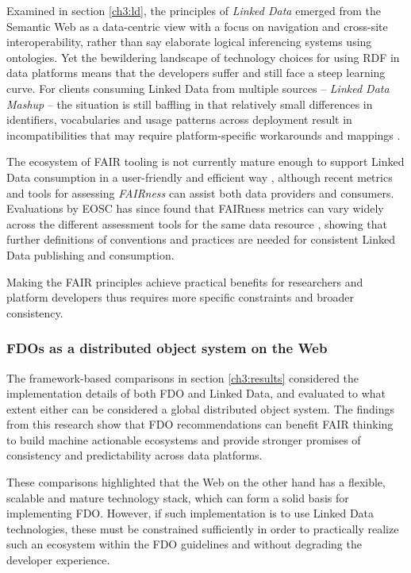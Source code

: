 Examined in section \vref{ch3:ld}, the principles of \emph{Linked Data} emerged from the Semantic Web as a data-centric view with a focus on navigation and cross-site interoperability, rather than say elaborate logical inferencing systems using ontologies.  
Yet the bewildering landscape of technology choices for using RDF in data platforms means that the developers suffer and still face a steep learning curve. 
For clients consuming Linked Data from multiple sources -- \emph{Linked Data Mashup} \cite{Tran 2014} -- the situation is still baffling in that relatively small differences in identifiers, vocabularies and usage patterns across deployment result in incompatibilities that may require platform-specific workarounds and mappings \cite{Millard 2010}. 

The ecosystem of FAIR tooling is not currently mature enough to support Linked Data consumption in a user-friendly and efficient way \cite{Thompson 2020}, although recent metrics and tools for assessing \emph{FAIRness} \cite{Wilkinson 2018} can assist both data providers and consumers. 
Evaluations by EOSC has since found that FAIRness metrics can vary widely across the different assessment tools for the same data resource \cite{10.5281/zenodo.7463421}, showing that further definitions of conventions and practices are needed for consistent Linked Data publishing and consumption. 

Making the FAIR principles achieve practical benefits for researchers and platform developers thus requires more specific constraints and broader consistency.

\subsubsection{FDOs as a distributed object system on the Web}
\label{ch61:distributed}

The framework-based comparisons in section \vref{ch3:results} considered the implementation details of both FDO and Linked Data, and evaluated to what extent either can be considered a global distributed object system. 
The findings from this research show that FDO recommendations can benefit FAIR thinking to build machine actionable ecosystems and provide stronger promises of consistency and predictability across data platforms. 

These comparisons highlighted that the Web on the other hand has a flexible, scalable and mature technology stack, which can form a solid basis for implementing FDO. 
However, if such implementation is to use Linked Data technologies, these must be constrained sufficiently in order to practically realize such an ecosystem within the FDO guidelines and without degrading the developer experience.


